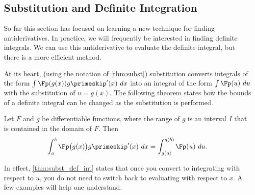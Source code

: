 \subsection{Substitution and Definite Integration}

So far this section has focused on learning a new technique for finding antiderivatives. In practice, we will frequently be interested in finding definite integrals. We can use this antiderivative to evaluate the definite integral, but there is a more efficient method.

At its heart, (using the notation of \autoref{thm:subst}) substitution converts integrals of the form $\int \Fp(g(x))g\primeskip'(x)\ dx$ into an integral of the form $\int \Fp(u)\ du$ with the substitution of $u = g(x)$. The following theorem states how the bounds of a definite integral can be changed as the substitution is performed.

\begin{theorem}\label{thm:subst_def_int}
Let $F$ and $g$ be differentiable functions, where the range of $g$ is an interval $I$ that is contained in the domain of $F$. Then 
\[\int_a^b \Fp\bigl(g(x)\bigr)g\primeskip'(x)\ dx = \int_{g(a)}^{g(b)} \Fp(u)\ du.\]
\end{theorem}

In effect, \autoref{thm:subst_def_int} states that once you convert to integrating with respect to $u$, you do not need to switch back to evaluating with respect to $x$. A few examples will help one understand.

